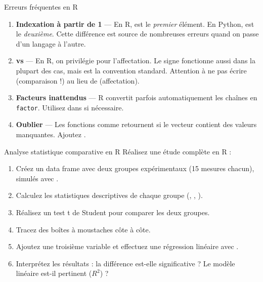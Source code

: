 \begin{errmark}{Erreurs fr\'equentes en R}
\begin{enumerate}
  \item \textbf{Indexation \`a partir de 1} --- En R,  est le
    \emph{premier} \'el\'ement. En Python,  est le \emph{deuxi\`eme}. Cette diff\'erence
    est source de nombreuses erreurs quand on passe d'un langage \`a l'autre.
  \item \textbf{\ri{<-} vs \ri{=}} --- En R, on privil\'egie \ri{<-} pour l'affectation.
    Le signe \ri{=} fonctionne aussi dans la plupart des cas, mais \ri{<-} est la
    convention standard. Attention \`a ne pas \'ecrire  (comparaison !) au
    lieu de  (affectation).
  \item \textbf{Facteurs inattendus} --- R convertit parfois automatiquement les cha\^ines
    en \texttt{factor}. Utilisez  dans
     si n\'ecessaire.
  \item \textbf{Oublier } --- Les fonctions comme  retournent
     si le vecteur contient des valeurs manquantes. Ajoutez .
\end{enumerate}
\end{errmark}

\begin{projet}{Analyse statistique comparative en R}
R\'ealisez une \'etude compl\`ete en R :
\begin{enumerate}
  \item Cr\'eez un data frame avec deux groupes exp\'erimentaux (15 mesures chacun),
    simul\'es avec .
  \item Calculez les statistiques descriptives de chaque groupe (, ,
    ).
  \item R\'ealisez un test t de Student pour comparer les deux groupes.
  \item Tracez des bo\^ites \`a moustaches c\^ote \`a c\^ote.
  \item Ajoutez une troisi\`eme variable et effectuez une r\'egression lin\'eaire avec .
  \item Interpr\'etez les r\'esultats : la diff\'erence est-elle significative ?
    Le mod\`ele lin\'eaire est-il pertinent ($R^2$) ?
\end{enumerate}
\end{projet}

